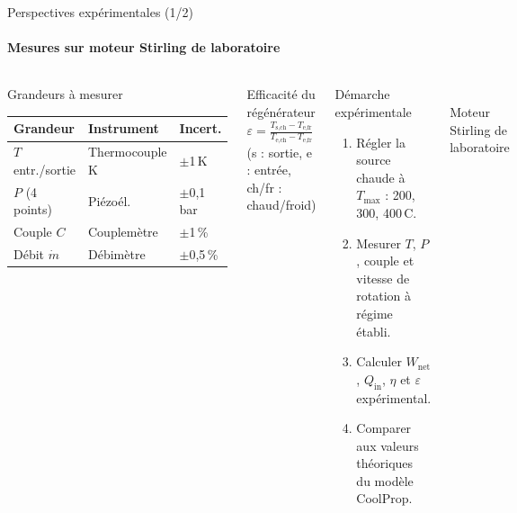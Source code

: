 \documentclass[aspectratio=43, 10pt]{beamer}
\newcommand{\Wnet}{W_{\text{net}}}
\newcommand{\Qin}{Q_{\text{in}}}
\begin{document}
\begin{frame}{Perspectives exp\'erimentales (1/2)}
  \framesubtitle{Mesures sur moteur Stirling de laboratoire}

  \begin{columns}[T,onlytextwidth]
      \begin{block}{Grandeurs \`a mesurer}
        \scriptsize
        \renewcommand{\arraystretch}{1.0}
        \begin{tabular}{lll}
          \toprule
          Grandeur & Instrument & Incert. \\
          \midrule
          $T$ entr./sortie & Thermocouple K   & $\pm$1\,K \\
          $P$ (4 points)   & Pi\'ezo\'el.     & $\pm$0{,}1\,bar \\
          Couple $C$       & Couplem\`etre    & $\pm$1\,\% \\
          D\'ebit $\dot m$ & D\'ebim\`etre    & $\pm$0{,}5\,\% \\
          \bottomrule
        \end{tabular}
      \end{block}

      \vspace{0.35em}
      \begin{block}{Efficacit\'e du r\'eg\'en\'erateur}
        \scriptsize
        $\varepsilon = \frac{T_{\text{s,ch}} - T_{\text{e,fr}}}
                            {T_{\text{e,ch}} - T_{\text{e,fr}}}$
        \hfill (s : sortie, e : entr\'ee, ch/fr : chaud/froid)
      \end{block}

      \begin{block}{D\'emarche exp\'erimentale}
        \footnotesize
        \begin{enumerate}\itemsep1pt
          \item R\'egler la source chaude \`a $T_{\max}$ :
                200, 300, 400\,\textdegree C.
          \item Mesurer $T$, $P$, couple et
                vitesse de rotation \`a r\'egime \'etabli.
          \item Calculer $\Wnet$, $\Qin$, $\eta$
                et $\varepsilon$ exp\'erimental.
          \item Comparer aux valeurs th\'eoriques
                du mod\`ele CoolProp.
        \end{enumerate}
      \end{block}

      \vspace{0.35em}
      {\centering
        \fbox{\rule{0pt}{0.8cm}\rule{2.0cm}{0pt}}\\[-2pt]
        \tiny Moteur Stirling de laboratoire\par}
  \end{columns}

\end{frame}
\end{document}
